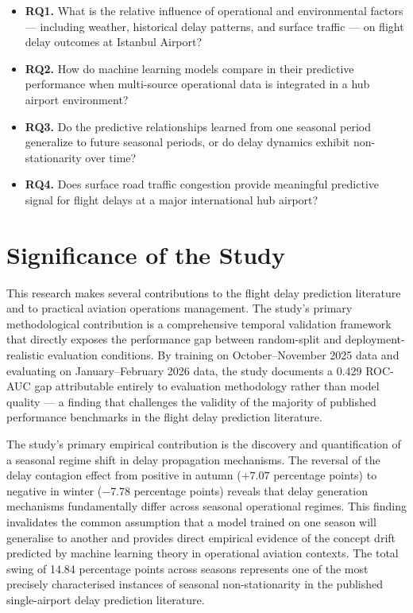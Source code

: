\documentclass{report}
\begin{document}
\begin{itemize}
    \item \textbf{RQ1.} What is the relative influence of operational and environmental factors --- including weather, historical delay patterns, and surface traffic --- on flight delay outcomes at Istanbul Airport?
    
    \item \textbf{RQ2.} How do machine learning models compare in their predictive performance when multi-source operational data is integrated in a hub airport environment?
    
    \item \textbf{RQ3.} Do the predictive relationships learned from one seasonal period generalize to future seasonal periods, or do delay dynamics exhibit non-stationarity over time?
    
    \item \textbf{RQ4.} Does surface road traffic congestion provide meaningful predictive signal for flight delays at a major international hub airport?
\end{itemize}

\section{Significance of the Study}

This research makes several contributions to the flight delay prediction 
literature and to practical aviation operations management. The study's primary 
methodological contribution is a comprehensive temporal validation framework that 
directly exposes the performance gap between random-split and deployment-realistic 
evaluation conditions. By training on October--November 2025 data and evaluating 
on January--February 2026 data, the study documents a 0.429 ROC-AUC gap 
attributable entirely to evaluation methodology rather than model quality --- 
a finding that challenges the validity of the majority of published performance 
benchmarks in the flight delay prediction literature.

The study's primary empirical contribution is the discovery and quantification 
of a seasonal regime shift in delay propagation mechanisms. The reversal of the 
delay contagion effect from positive in autumn ($+7.07$ percentage points) to 
negative in winter ($-7.78$ percentage points) reveals that delay generation 
mechanisms fundamentally differ across seasonal operational regimes. This finding 
invalidates the common assumption that a model trained on one season will 
generalise to another and provides direct empirical evidence of the concept drift 
predicted by machine learning theory in operational aviation contexts. The total 
swing of 14.84 percentage points across seasons represents one of the most 
precisely characterised instances of seasonal non-stationarity in the published 
single-airport delay prediction literature.
\end{document}
